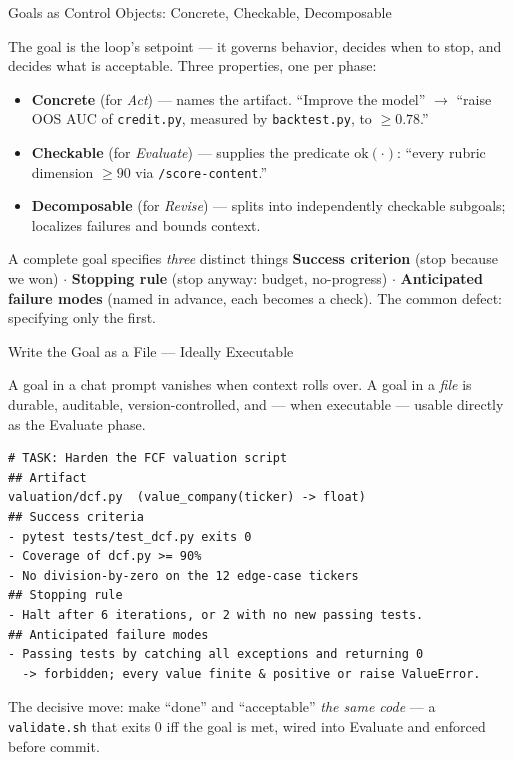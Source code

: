 \documentclass[9pt,t]{beamer}
\begin{document}
\begin{frame}{Goals as Control Objects: Concrete, Checkable, Decomposable}

The goal is the loop's \alert{setpoint} --- it governs behavior, decides when to
stop, and decides what is acceptable. Three properties, one per phase:

\medskip
\begin{itemize}
  \item \textbf{Concrete} (for \emph{Act}) --- names the artifact.
        ``Improve the model'' $\to$ ``raise OOS AUC of \texttt{credit.py},
        measured by \texttt{backtest.py}, to $\geq 0.78$.''
  \item \textbf{Checkable} (for \emph{Evaluate}) --- supplies the predicate
        $\mathrm{ok}(\cdot)$: ``every rubric dimension $\geq 90$ via
        \texttt{/score-content}.''
  \item \textbf{Decomposable} (for \emph{Revise}) --- splits into independently
        checkable subgoals; localizes failures and bounds context.
\end{itemize}

\medskip
\begin{block}{A complete goal specifies \emph{three} distinct things}
\textbf{Success criterion} (stop because we won) $\cdot$
\textbf{Stopping rule} (stop anyway: budget, no-progress) $\cdot$
\textbf{Anticipated failure modes} (named in advance, each becomes a check).
The common defect: specifying only the first.
\end{block}
\end{frame}

\begin{frame}[fragile]{Write the Goal as a File --- Ideally Executable}

A goal in a chat prompt vanishes when context rolls over. A goal in a \emph{file}
is durable, auditable, version-controlled, and --- when executable --- usable
\alert{directly as the Evaluate phase}.

\begin{lstlisting}[language={}]
# TASK: Harden the FCF valuation script
## Artifact
valuation/dcf.py  (value_company(ticker) -> float)
## Success criteria
- pytest tests/test_dcf.py exits 0
- Coverage of dcf.py >= 90%
- No division-by-zero on the 12 edge-case tickers
## Stopping rule
- Halt after 6 iterations, or 2 with no new passing tests.
## Anticipated failure modes
- Passing tests by catching all exceptions and returning 0
  -> forbidden; every value finite & positive or raise ValueError.
\end{lstlisting}

\smallskip
The decisive move: make ``done'' and ``acceptable'' \emph{the same code} --- a
\texttt{validate.sh} that exits 0 iff the goal is met, wired into Evaluate and
enforced before commit.
\end{frame}
\end{document}
